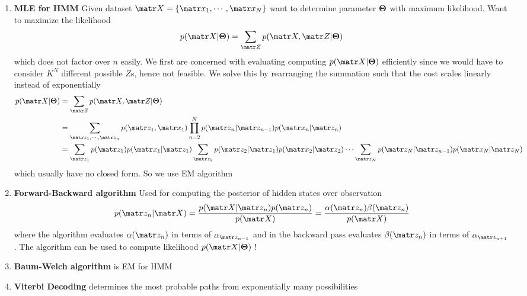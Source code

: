 \documentclass[11pt]{article}
\begin{document}
\begin{defn*}
\begin{enumerate}
\begin{enumerate}
        \end{enumerate}
        \item \textbf{MLE for HMM} Given dataset $\bX = \{\bx_1, \cdots, \bx_N\}$ want to determine parameter $\boldsymbol{\Theta}$ with maximum likelihood. Want to maximize the likelihood
        \[
            p(\bX | \bTheta) = \sum_{\bZ} p(\bX, \bZ | \bTheta)    
        \]
        which does not factor over $n$ easily. We first are concerned with evaluating computing $p(\bX | \bTheta)$ efficiently since we would have to consider $K^N$ different possible $Z$s, hence not feasible. We solve this by rearranging the summation such that the cost scales linearly instead of exponentially 
        \begin{align*}
            p(\bX | \bTheta)
            &= \sum_{\bZ} p(\bX, \bZ | \bTheta) \\ 
            &= \sum_{\bz_1, \cdots, \bz_n} p(\bz_1, \bx_1) \prod_{n=2}^N p(\bz_n | \bz_{n-1}) p(\bx_n | \bz_n)  \\ 
            &= \sum_{\bz_1} p(\bz_1) p(\bx_1 | \bz_1) \sum_{\bz_2} p(\bz_2 |\bz_1) p(\bx_2 | \bz_2) \cdots \sum_{\bz_N} p(\bz_{N} | \bz_{n-1}) p(\bx_N | \bz_N)
        \end{align*}
        which usually have no closed form. So we use EM algorithm 
        \item \textbf{Forward-Backward algorithm} Used for computing the posterior of hidden states over observation 
        \[
            p(\bz_n | \bX) = \frac{p(\bX | \bz_n)p(\bz_n)}{p(\bX)} = \frac{\alpha(\bz_n)\beta(\bz_n)}{p(\bX)}
        \]
        where the algorithm evaluates $\alpha(\bz_n)$ in terms of $\alpha_{\bz_{n-1}}$ and in the backward pass evaluates $\beta(\bz_n)$ in terms of $\alpha_{\bz_{n+1}}$. The algorithm can be used to compute likelihood $p(\bX | \bTheta)$ !
        \item \textbf{Baum-Welch algorithm} is EM for HMM
        \item \textbf{Viterbi Decoding} determines the most probable paths from exponentially many possibilities
    \end{enumerate}
\end{defn*}
\end{document}
